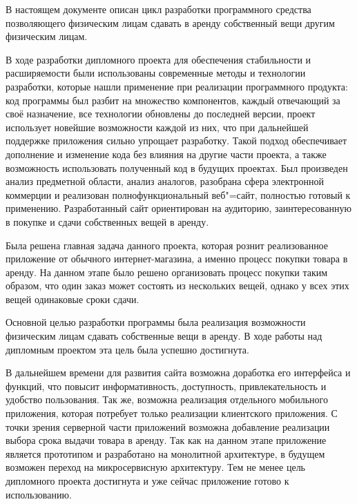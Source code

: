 
В настоящем документе описан цикл разработки программного средства позволяющего физическим лицам сдавать в аренду собственный вещи другим физическим лицам.

В ходе разработки дипломного проекта для обеспечения стабильности и расширяемости были использованы современные методы и технологии разработки, которые нашли
применение при реализации программного продукта: код программы был разбит на множество компонентов, каждый отвечающий за своё назначение, все технологии обновлены до последней версии, проект использует новейшие
возможности каждой из них, что при дальнейшей поддержке приложения сильно упрощает разработку.
Такой подход обеспечивает дополнение и изменение кода без влияния на другие части проекта, а также возможность использовать полученный код в будущих проектах.
Был произведен анализ предметной области, анализ аналогов, разобрана сфера электронной коммерции и реализован полнофункциональный веб"=сайт, полностью готовый к применению.
Разработанный сайт ориентирован на аудиторию, заинтересованную в покупке и сдачи собственных вещей в аренду.

Была решена главная задача данного проекта, которая рознит реализованное приложение от обычного интернет-магазина, а именно процесс покупки товара в аренду.
На данном этапе было решено организовать процесс покупки таким образом, что один заказ может состоять из нескольких вещей, однако у всех этих вещей одинаковые сроки сдачи.


Основной целью разработки программы была реализация возможности физическим лицам сдавать собственные вещи в аренду.
В ходе работы над дипломным проектом эта цель была успешно достигнута.

В дальнейшем времени для развития сайта возможна доработка его интерфейса и функций, что повысит информативность, доступность, привлекательность и удобство пользования.
Так же, возможна реализация отдельного мобильного приложения, которая потребует только реализации клиентского приложения.
С точки зрения серверной части приложений возможна добавление реализации выбора срока выдачи товара в аренду.
Так как на данном этапе приложение является прототипом и разработано на монолитной архитектуре, в будущем возможен переход на микросервисную архитектуру.
Тем не менее цель дипломного проекта достигнута и уже сейчас приложение готово к использованию.
